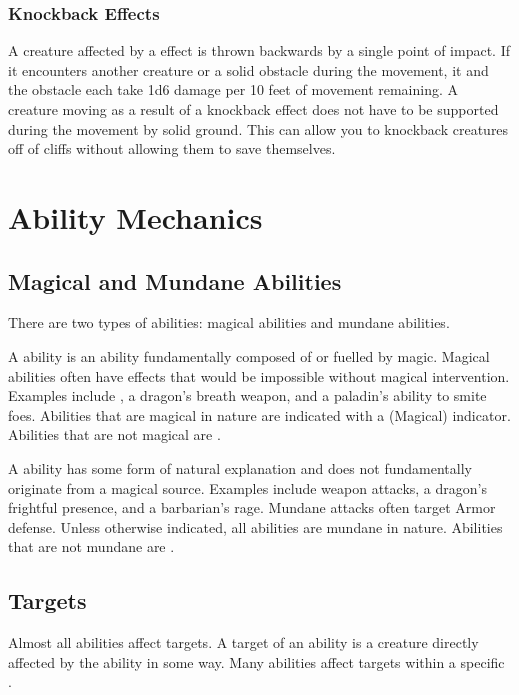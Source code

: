         \subsubsection{Knockback Effects}\label{Knockback Effects}
            A creature affected by a  effect is thrown backwards by a single point of impact.
            If it encounters another creature or a solid obstacle during the movement, it and the obstacle each take 1d6 damage per 10 feet of movement remaining.
            A creature moving as a result of a knockback effect does not have to be supported during the movement by solid ground.
            This can allow you to knockback creatures off of cliffs without allowing them to save themselves.

\section{Ability Mechanics}\label{Ability Mechanics}

    \subsection{Magical and Mundane Abilities}\label{Magical and Mundane Abilities}

        There are two types of abilities: magical abilities and mundane abilities.

        \label{Magical Abilities} A  ability is an ability fundamentally composed of or fuelled by magic.
        Magical abilities often have effects that would be impossible without magical intervention.
        Examples include , a dragon's breath weapon, and a paladin's ability to smite foes.
        Abilities that are magical in nature are indicated with a (Magical) indicator.
        Abilities that are not magical are .

        \label{Mundane Abilities} A  ability has some form of natural explanation and does not fundamentally originate from a magical source.
        Examples include weapon attacks, a dragon's frightful presence, and a barbarian's rage.
        Mundane attacks often target Armor defense.
        Unless otherwise indicated, all abilities are mundane in nature.
        Abilities that are not mundane are .

    \subsection{Targets}\label{Targets}
        Almost all abilities affect targets.
        A target of an ability is a creature directly affected by the ability in some way.
        Many abilities affect targets within a specific .

